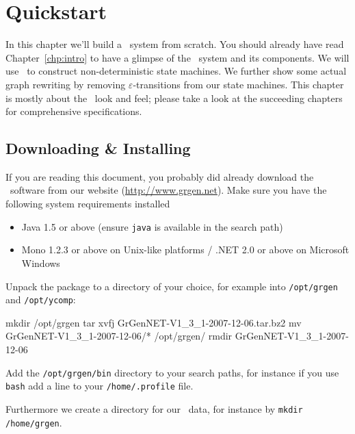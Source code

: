 \chapter{Quickstart}

In this chapter we'll build a \GrG\ system from scratch. 
You should already have read Chapter~\ref{chp:intro} to have a glimpse of the \GrG\ system and its components.
We will use \GrG\ to construct non-deterministic state machines.
We further show some actual graph rewriting by removing $\varepsilon$-transitions from our state machines.
This chapter is mostly about the \GrG\ look and feel; please take a look at the succeeding chapters for comprehensive specifications.

\section{Downloading \& Installing}
If you are reading this document, you probably did already download the \GrG\ software from our website (\url{http://www.grgen.net}).
Make sure you have the following system requirements installed
\begin{itemize}
	\item Java 1.5 or above \footnotesize{(ensure \texttt{java} is available in the search path)}
	\item Mono 1.2.3 or above on Unix-like platforms / .NET 2.0 or above on Microsoft Windows 
\end{itemize}
Unpack the package to a directory of your choice, for example into \texttt{/opt/grgen} and \texttt{/opt/ycomp}:
\begin{bash}
mkdir /opt/grgen
tar xvfj GrGenNET-V1_3_1-2007-12-06.tar.bz2
mv GrGenNET-V1_3_1-2007-12-06/* /opt/grgen/
rmdir GrGenNET-V1_3_1-2007-12-06
\end{bash}
Add the \texttt{/opt/grgen/bin} directory to your search paths, for instance if you use \texttt{bash} add a line to your \texttt{/home/.profile} file.
Furthermore we create a directory for our \GrG\ data, for instance by \texttt{mkdir /home/grgen}.

